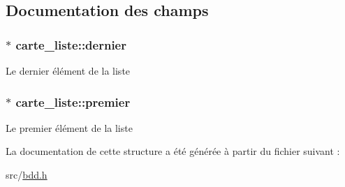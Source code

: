 \subsection{Documentation des champs}
\subsubsection[{\texorpdfstring{dernier}{dernier}}]{$\ast$ carte\+\_\+liste\+::dernier}\hypertarget{structcarte__liste_abeffe6f9b0cfe0111b785b92ac2af410}{}\label{structcarte__liste_abeffe6f9b0cfe0111b785b92ac2af410}
Le dernier élément de la liste 
\subsubsection[{\texorpdfstring{premier}{premier}}]{$\ast$ carte\+\_\+liste\+::premier}\hypertarget{structcarte__liste_aab2e8cf4d231e6f335d4dc99343d1421}{}\label{structcarte__liste_aab2e8cf4d231e6f335d4dc99343d1421}
Le premier élément de la liste 

La documentation de cette structure a été générée à partir du fichier suivant \+:\begin{DoxyCompactItemize}
\item 
src/\hyperlink{bdd_8h}{bdd.\+h}\end{DoxyCompactItemize}
